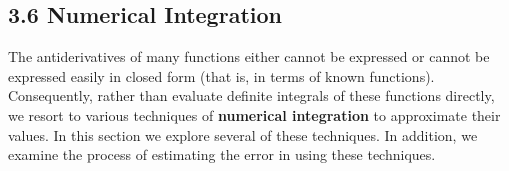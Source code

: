 \documentclass{report}
\begin{document}
    \pagebreak \bigbreak \noindent 
    \subsection*{3.6 Numerical Integration}
    \bigbreak \noindent 
    The antiderivatives of many functions either cannot be expressed or cannot be expressed easily in closed form (that is, in terms of known functions). Consequently, rather than evaluate definite integrals of these functions directly, we resort to various techniques of \textbf{numerical integration} to approximate their values. In this section we explore several of these techniques. In addition, we examine the process of estimating the error in using these techniques.
    \bigbreak \noindent 
\end{document}
